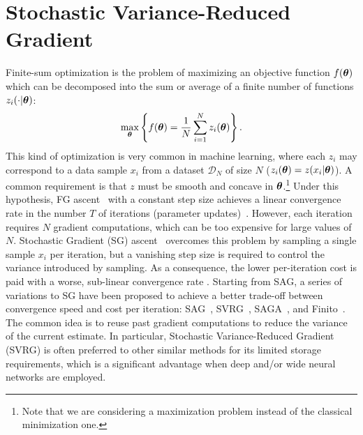 \section{Stochastic Variance-Reduced Gradient}\label{sec:svrg}
\vspace{-0.05in}
Finite-sum optimization is the problem of maximizing an objective function $f(\boldsymbol{\theta})$ which can be decomposed into the sum or average of a finite number of functions $z_i(\cdot|\boldsymbol{\theta})$:
\begin{align*}
        \max_{\boldsymbol{\theta}} \left\{ f(\boldsymbol{\theta}) = \frac{1}{N}\sum_{i=1}^{N}z_i(\boldsymbol{\theta})\right\}.
\end{align*}
This kind of optimization is very common in machine learning, where each $z_i$ may correspond to a data sample $x_i$ from a dataset $\mathcal{D}_N$ of size $N$ (\ie $z_i(\boldsymbol{\theta}) = z(x_i|\boldsymbol{\theta})$). 
A common requirement is that $z$ must be smooth and concave in $\boldsymbol{\theta}$.\footnote{Note that we are considering a maximization problem instead of the classical minimization one.} 
Under this hypothesis, \acs{FG} ascent~\citep{cauchy1847methode} with a constant step size achieves a linear convergence rate in the number $T$ of iterations (\ie parameter updates)~\citep{nesterov2013introductory}.
However, each iteration requires $N$ gradient computations, which can be too expensive for large values of $N$. Stochastic Gradient (\acs{SG}) ascent~\citep[\eg][]{robbins1951stochastic,bottou2004large} overcomes this problem by sampling a single sample $x_i$ per iteration, but a vanishing step size is required to control the variance introduced by sampling. As a consequence, the lower per-iteration cost is paid with a worse, sub-linear convergence rate \citep{nemirovskii1983problem}.
Starting from \acs{SAG}, a series of variations to \acs{SG} have been proposed to achieve a better trade-off between convergence speed and cost per iteration: \eg \acs{SAG}~\citep{roux2012stochastic}, \acs{SVRG}~\citep{johnson2013accelerating}, \acs{SAGA}~\citep{defazio2014saga}, and Finito~\citep{defazio2014finito}. 
The common idea is to reuse past gradient computations to reduce the variance of the current estimate.
In particular, Stochastic Variance-Reduced Gradient (\acs{SVRG}) is often preferred to other similar methods for its limited storage requirements, which is a significant advantage when deep and/or wide neural networks are employed.  

